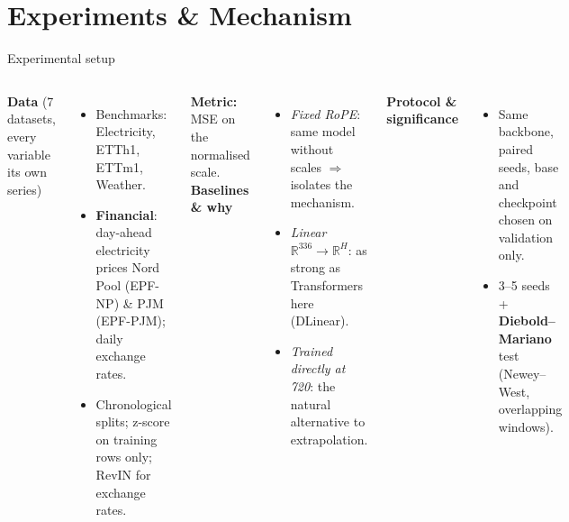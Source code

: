 \documentclass[aspectratio=169,xcolor=dvipsnames]{beamer}
\begin{document}
\section{Experiments \& Mechanism}

\begin{frame}{Experimental setup}
\begin{columns}[T]
\textbf{Data} (7 datasets, every variable its own series)
\begin{itemize}\small
\item Benchmarks: Electricity, ETTh1, ETTm1, Weather.
\item \textbf{Financial}: day-ahead electricity prices Nord Pool (EPF-NP) \& PJM (EPF-PJM); daily exchange rates.
\item Chronological splits; z-score on training rows only; RevIN for exchange rates.
\end{itemize}
\textbf{Metric:} MSE on the normalised scale.
\textbf{Baselines \& why}
\begin{itemize}\small
\item \emph{Fixed RoPE}: same model without scales $\Rightarrow$ isolates the mechanism.
\item \emph{Linear} $\mathbb{R}^{336}\!\to\!\mathbb{R}^H$: as strong as Transformers here (DLinear).
\item \emph{Trained directly at 720}: the natural alternative to extrapolation.
\end{itemize}
\textbf{Protocol \& significance}
\begin{itemize}\small
\item Same backbone, paired seeds, base and checkpoint chosen on validation only.
\item 3--5 seeds + \textbf{Diebold--Mariano} test (Newey--West, overlapping windows).
\end{itemize}
\end{columns}
\end{frame}
\end{document}
